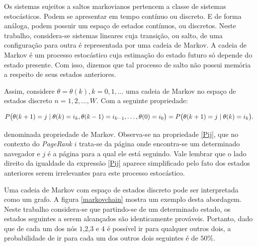 Os sistemas sujeitos a saltos markovianos pertencem a classe de sistemas estocásticos. Podem se apresentar em tempo contínuo ou discreto. E de forma análoga, podem possuir um espaço de estados contínuos, ou discretos. Neste trabalho, considera-se sistemas lineares cuja transição, ou salto, de uma configuração para outra é representada por uma cadeia de Markov. A cadeia de Markov é um processo estocástico cuja estimação do estado futuro só depende do estado presente. Com isso, dizemos que tal processo de salto não possui memória a respeito de seus estados anteriores.


Assim, considere $\theta = {\theta(k), k = 0,1,...}$ uma cadeia de Markov no espaço de estados discreto $n = {1, 2, … , W}$. Com a seguinte propriedade: 


\begin{equation}\label{Pij}
P \bigl( \theta(k+1) = j \mid  \theta(k) = i_k, \theta(k-1) = i_{k-1}, \ldots, \theta(0) = i_0\bigr) =\\
P \bigl( \theta(k+1) = j \mid  \theta(k) = i_k\bigr).
\end{equation}

\noindent denominada propriedade de Markov. Observa-se na propriedade \eqref{Pij}, que no contexto do \textit{PageRank} $i$ trata-se da página onde encontra-se um determinado navegador e $j$ é a página para a qual ele está seguindo. Vale lembrar que o lado direito da igualdade da expressão \eqref{Pij} aparece simplificado pelo fato dos estados anteriores serem irrelevantes para este processo estocástico.   

Uma cadeia de Markov com espaço de estados discreto pode ser interpretada como um grafo. A figura \ref{markovchain} mostra um exemplo desta abordagem. Neste trabalho considera-se que partindo-se de um determinado estado, os estados seguintes a serem alcançados são identicamente prováveis. Portanto, dado que de cada um dos nós $1$,$2$,$3$ e $4$ é possível ir para qualquer outros dois, a probabilidade de ir para cada um dos outros dois seguintes é de $50\%$.


